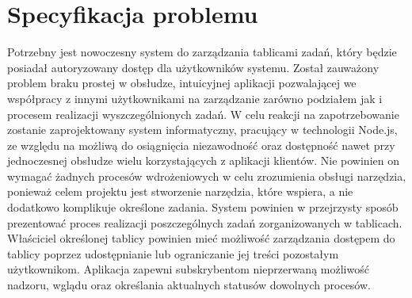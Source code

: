 \documentclass[12pt]{report}
\begin{document}
\section{Specyfikacja problemu}
Potrzebny jest nowoczesny system do zarządzania tablicami zadań, który będzie posiadał autoryzowany dostęp dla użytkowników systemu. 
Został zauważony problem braku prostej w obsłudze, intuicyjnej aplikacji pozwalającej we współpracy z innymi użytkownikami na zarządzanie zarówno podziałem jak i procesem realizacji wyszczególnionych zadań.
W celu reakcji na zapotrzebowanie zostanie zaprojektowany system informatyczny, pracujący w technologii Node.js, ze względu na możliwą do osiągnięcia niezawodność oraz dostępność nawet przy jednoczesnej obsłudze wielu korzystających z aplikacji klientów.
Nie powinien on wymagać żadnych procesów wdrożeniowych w celu zrozumienia obsługi narzędzia, ponieważ celem projektu jest stworzenie narzędzia, które wspiera, a nie dodatkowo komplikuje określone zadania.
System powinien w przejrzysty sposób prezentować proces realizacji poszczególnych zadań zorganizowanych w tablicach.
Właściciel określonej tablicy powinien mieć możliwość zarządzania dostępem do tablicy poprzez udostępnianie lub ograniczanie jej treści pozostałym użytkownikom.
Aplikacja zapewni subskrybentom nieprzerwaną możliwość nadzoru, wglądu oraz określania aktualnych statusów dowolnych procesów.
\newpage
\end{document}
